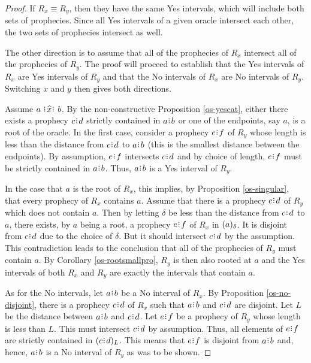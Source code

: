 \documentclass[12pt]{article}
\begin{document}
\begin{proof}
    If $R_x \equiv R_y$, then they have the same Yes intervals, which will include both sets of prophecies. Since all Yes intervals of a given oracle intersect each other, the two sets of prophecies intersect as well. 
    
    The other direction is to assume that all of the prophecies of $R_x$ intersect all of the prophecies of $R_y$. The proof will proceed to establish that the Yes intervals of $R_x$ are Yes intervals of $R_y$ and that the No intervals of $R_x$ are No intervals of $R_y$. Switching $x$ and $y$ then gives both directions.  

    Assume $a \xora b$. By the non-constructive Proposition \ref{os-yescat}, either there exists a prophecy $c\rint d$ strictly contained in $a\rint b$ or one of the endpoints, say $a$, is a root of the oracle. In the first case, consider a prophecy $e\rint f$ of $R_y$ whose length is less than the distance from $c\rint d$ to $a\rint b$ (this is the smallest distance between the endpoints). By assumption, $e\rint f$ intersects $c\rint d$ and by choice of length, $e\rint f$ must be strictly contained in $a\rint b$. Thus, $a\rint b$ is a Yes interval of $R_y$.

    In the case that $a$ is the root of $R_x$, this implies, by Proposition \ref{os-singular}, that every prophecy of $R_x$ contains $a$. Assume that there is a prophecy $c\rint d$ of $R_y$ which does not contain $a$. Then by letting $\delta$ be less than the distance from $c\rint d$ to $a$, there exists, by $a$ being a root, a prophecy $e\rint f$ of $R_x$ in $(a)_{\delta}$. It is disjoint from $c\rint d$ due to the choice of $\delta$. But it should intersect $c\rint d$ by the assumption. This contradiction leads to the conclusion that all of the prophecies of $R_y$ must contain $a$. By Corollary \ref{os-rootsmallpro}, $R_y$ is then also rooted at $a$  and the Yes intervals of both $R_x$ and $R_y$ are exactly the intervals that contain $a$. 
    
    As for the No intervals, let $a\rint b$ be a No interval of $R_x$. By Proposition \ref{os-no-disjoint}, there is a prophecy $c\rint d$ of $R_x$ such that $a\rint b$ and $c\rint d$ are disjoint. Let $L$ be the distance between $a\rint b$ and $c\rint d$. Let $e\rint f$ be a prophecy of $R_y$ whose length is less than $L$. This must intersect $c\rint d$ by assumption. Thus, all elements of $e\rint f$ are strictly contained in $\halo[L]{c\rint d}$. This means that $e\rint f$ is disjoint from $a\rint b$ and, hence, $a\rint b$ is a No interval of $R_y$ as was to be shown. 
\end{proof} 
\end{document}
